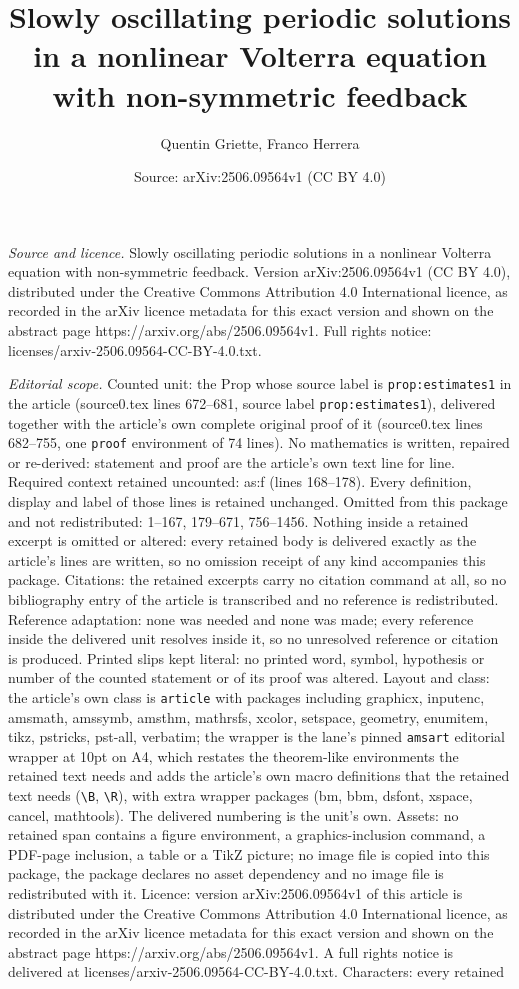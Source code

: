 \documentclass[10pt,a4paper]{amsart}
\title[Slowly oscillating periodic solutions in a nonlinear Volterr]{Slowly oscillating periodic solutions in a nonlinear Volterra equation with non-symmetric feedback}
\author{Quentin Griette, Franco Herrera}
\date{Source: arXiv:2506.09564v1 (CC BY 4.0)}
\begin{document}
\maketitle

\noindent\emph{Source and licence.} Slowly oscillating periodic solutions in a nonlinear Volterra equation with non-symmetric feedback. Version arXiv:2506.09564v1 (CC BY 4.0), distributed under the Creative Commons Attribution 4.0 International licence, as recorded in the arXiv licence metadata for this exact version and shown on the abstract page https://arxiv.org/abs/2506.09564v1. Full rights notice: licenses/arxiv-2506.09564-CC-BY-4.0.txt.\par\smallskip

\noindent\textit{Editorial scope.} Counted unit: the Prop whose source label is \texttt{prop:estimates1} in the article (source0.tex lines 672--681, source label \texttt{prop:estimates1}), delivered together with the article's own complete original proof of it (source0.tex lines 682--755, one \texttt{proof} environment of 74 lines). No mathematics is written, repaired or re-derived: statement and proof are the article's own text line for line. Required context retained uncounted: as:f (lines 168--178). Every definition, display and label of those lines is retained unchanged. Omitted from this package and not redistributed: 1--167, 179--671, 756--1456. Nothing inside a retained excerpt is omitted or altered: every retained body is delivered exactly as the article's lines are written, so no omission receipt of any kind accompanies this package. Citations: the retained excerpts carry no citation command at all, so no bibliography entry of the article is transcribed and no reference is redistributed. Reference adaptation: none was needed and none was made; every reference inside the delivered unit resolves inside it, so no unresolved reference or citation is produced. Printed slips kept literal: no printed word, symbol, hypothesis or number of the counted statement or of its proof was altered. Layout and class: the article's own class is \texttt{article} with packages including graphicx, inputenc, amsmath, amssymb, amsthm, mathrsfs, xcolor, setspace, geometry, enumitem, tikz, pstricks, pst-all, verbatim; the wrapper is the lane's pinned \texttt{amsart} editorial wrapper at 10pt on A4, which restates the theorem-like environments the retained text needs and adds the article's own macro definitions that the retained text needs (\texttt{\textbackslash B}, \texttt{\textbackslash R}), with extra wrapper packages (bm, bbm, dsfont, xspace, cancel, mathtools). The delivered numbering is the unit's own. Assets: no retained span contains a figure environment, a graphics-inclusion command, a PDF-page inclusion, a table or a TikZ picture; no image file is copied into this package, the package declares no asset dependency and no image file is redistributed with it. Licence: version arXiv:2506.09564v1 of this article is distributed under the Creative Commons Attribution 4.0 International licence, as recorded in the arXiv licence metadata for this exact version and shown on the abstract page https://arxiv.org/abs/2506.09564v1. A full rights notice is delivered at licenses/arxiv-2506.09564-CC-BY-4.0.txt. Characters: every retained 
\end{document}
